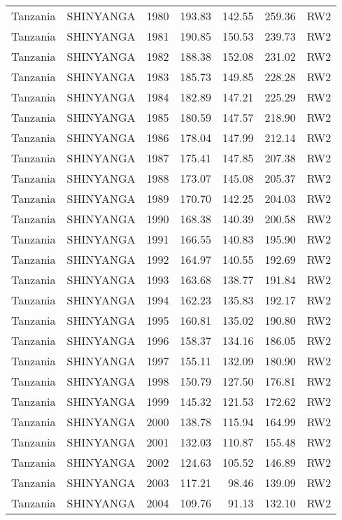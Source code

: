 \begin{longtable}{lllrrrl}
  Tanzania & SHINYANGA & 1980 & 193.83 & 142.55 & 259.36 & RW2 \\ 
  Tanzania & SHINYANGA & 1981 & 190.85 & 150.53 & 239.73 & RW2 \\ 
  Tanzania & SHINYANGA & 1982 & 188.38 & 152.08 & 231.02 & RW2 \\ 
  Tanzania & SHINYANGA & 1983 & 185.73 & 149.85 & 228.28 & RW2 \\ 
  Tanzania & SHINYANGA & 1984 & 182.89 & 147.21 & 225.29 & RW2 \\ 
  Tanzania & SHINYANGA & 1985 & 180.59 & 147.57 & 218.90 & RW2 \\ 
  Tanzania & SHINYANGA & 1986 & 178.04 & 147.99 & 212.14 & RW2 \\ 
  Tanzania & SHINYANGA & 1987 & 175.41 & 147.85 & 207.38 & RW2 \\ 
  Tanzania & SHINYANGA & 1988 & 173.07 & 145.08 & 205.37 & RW2 \\ 
  Tanzania & SHINYANGA & 1989 & 170.70 & 142.25 & 204.03 & RW2 \\ 
  Tanzania & SHINYANGA & 1990 & 168.38 & 140.39 & 200.58 & RW2 \\ 
  Tanzania & SHINYANGA & 1991 & 166.55 & 140.83 & 195.90 & RW2 \\ 
  Tanzania & SHINYANGA & 1992 & 164.97 & 140.55 & 192.69 & RW2 \\ 
  Tanzania & SHINYANGA & 1993 & 163.68 & 138.77 & 191.84 & RW2 \\ 
  Tanzania & SHINYANGA & 1994 & 162.23 & 135.83 & 192.17 & RW2 \\ 
  Tanzania & SHINYANGA & 1995 & 160.81 & 135.02 & 190.80 & RW2 \\ 
  Tanzania & SHINYANGA & 1996 & 158.37 & 134.16 & 186.05 & RW2 \\ 
  Tanzania & SHINYANGA & 1997 & 155.11 & 132.09 & 180.90 & RW2 \\ 
  Tanzania & SHINYANGA & 1998 & 150.79 & 127.50 & 176.81 & RW2 \\ 
  Tanzania & SHINYANGA & 1999 & 145.32 & 121.53 & 172.62 & RW2 \\ 
  Tanzania & SHINYANGA & 2000 & 138.78 & 115.94 & 164.99 & RW2 \\ 
  Tanzania & SHINYANGA & 2001 & 132.03 & 110.87 & 155.48 & RW2 \\ 
  Tanzania & SHINYANGA & 2002 & 124.63 & 105.52 & 146.89 & RW2 \\ 
  Tanzania & SHINYANGA & 2003 & 117.21 & 98.46 & 139.09 & RW2 \\ 
  Tanzania & SHINYANGA & 2004 & 109.76 & 91.13 & 132.10 & RW2 \\ 

\end{longtable}
